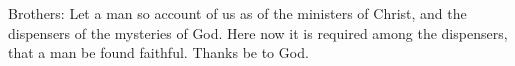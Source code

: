 Brothers: Let a man so account of us as of the ministers of Christ, and the dispensers of the mysteries of God. Here now it is required among the dispensers, that a man be found faithful. \rubric{\Rbar} Thanks be to God.